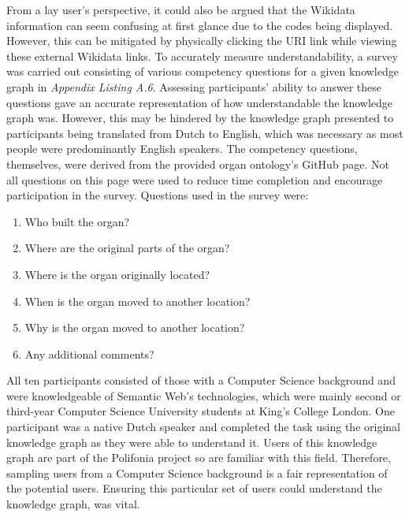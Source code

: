 From a lay user's perspective, it could also be argued that the Wikidata information can seem confusing at first glance due to the codes being displayed. However, this can be mitigated by physically clicking the URI link while viewing these external Wikidata links.  
To accurately measure understandability, a survey was carried out consisting of various competency questions for a given knowledge graph in \textit{Appendix Listing A.6}. Assessing participants' ability to answer these questions gave an accurate representation of how understandable the knowledge graph was. However, this may be hindered by the knowledge graph presented to participants being translated from Dutch to English, which was necessary as most people were predominantly English speakers. The competency questions, themselves, were derived from the provided organ ontology's GitHub page. Not all questions on this page were used to reduce time completion and encourage participation in the survey. Questions used in the survey were:

\begin{enumerate}
    \item Who built the organ?
    \vspace{-0.25cm}
    \item Where are the original parts of the organ?
    \vspace{-0.25cm}
    \item Where is the organ originally located?
    \vspace{-0.25cm}
    \item When is the organ moved to another location?
    \vspace{-0.25cm}
    \item Why is the organ moved to another location? 
    \vspace{-0.25cm}
    \item Any additional comments?
\end{enumerate}

All ten participants consisted of those with a Computer Science background and were knowledgeable of Semantic Web's technologies, which were mainly second or third-year Computer Science University students at King's College London. One participant was a native Dutch speaker and completed the task using the original knowledge graph as they were able to understand it. Users of this knowledge graph are part of the Polifonia project so are familiar with this field. Therefore, sampling users from a Computer Science background is a fair representation of the potential users. Ensuring this particular set of users could understand the knowledge graph, was vital. 

